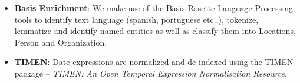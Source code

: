 \begin{itemize}
\item \textbf{Basis Enrichment}: We make use of the Basis Rosette Language Processing tools to identify text language (spanish, portuguese etc.,), tokenize, lemmatize and identify named entities as well as classify them into Locations, Person and Organization.

\item \textbf{TIMEN}: Date expressions are normalized and de-indexed using the TIMEN package -- {\em TIMEN: An Open Temporal Expression Normalisation Resource}.
\end{itemize}

